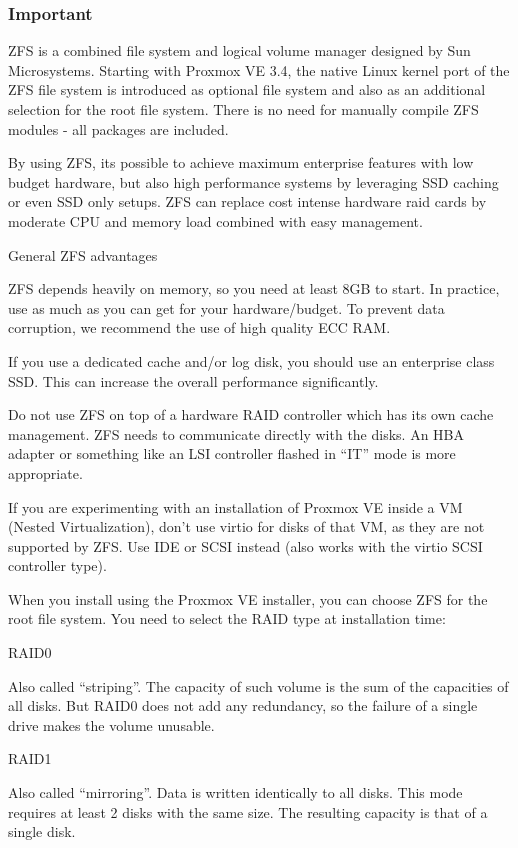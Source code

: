 \subsubsection{Important}

ZFS is a combined file system and logical volume manager designed by Sun Microsystems. Starting with Proxmox VE 3.4, the native Linux kernel port of the ZFS file system is introduced as optional file system and also as an additional selection for the root file system. There is no need for manually compile ZFS modules - all packages are included.

By using ZFS, its possible to achieve maximum enterprise features with low budget hardware, but also high performance systems by leveraging SSD caching or even SSD only setups. ZFS can replace cost intense hardware raid cards by moderate CPU and memory load combined with easy management.

General ZFS advantages

ZFS depends heavily on memory, so you need at least 8GB to start. In practice, use as much as you can get for your hardware/budget. To prevent data corruption, we recommend the use of high quality ECC RAM.

If you use a dedicated cache and/or log disk, you should use an enterprise class SSD. This can increase the overall performance significantly.

Do not use ZFS on top of a hardware RAID controller which has its own cache management. ZFS needs to communicate directly with the disks. An HBA adapter or something like an LSI controller flashed in “IT” mode is more appropriate.

If you are experimenting with an installation of Proxmox VE inside a VM (Nested Virtualization), don’t use virtio for disks of that VM, as they are not supported by ZFS. Use IDE or SCSI instead (also works with the virtio SCSI controller type).

When you install using the Proxmox VE installer, you can choose ZFS for the root file system. You need to select the RAID type at installation time:

RAID0

Also called “striping”. The capacity of such volume is the sum of the capacities of all disks. But RAID0 does not add any redundancy, so the failure of a single drive makes the volume unusable.

RAID1

Also called “mirroring”. Data is written identically to all disks. This mode requires at least 2 disks with the same size. The resulting capacity is that of a single disk.

